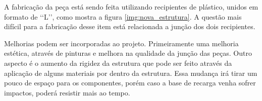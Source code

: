 \begin{itemize}
        A fabricação da peça está sendo feita utilizando recipientes de plástico, unidos em formato de \lq\lq L\rq\rq, como mostra a figura \ref{img:nova_estrutura}. A questão mais difícil para a fabricação desse item está relacionada a junção dos dois recipientes.

        Melhorias podem ser incorporadas ao projeto. Primeiramente uma melhoria estética, através de pinturas e melhora na qualidade da junção das peças. Outro aspecto é o aumento da rigidez da estrutura que pode ser feito através da aplicação de alguns materiais por dentro da estrutura. Essa mudança irá tirar um pouco de espaço para os componentes, porém caso a base de recarga venha sofrer impactos, poderá resistir mais ao tempo.

   \end{itemize}
 		


